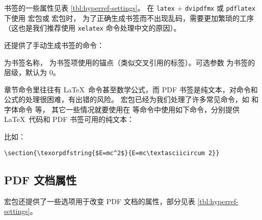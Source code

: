 书签的一些属性见表 \ref{tbl:hyperref-settings}。
在 \texttt{latex} + \texttt{dvipdfmx} 或 \texttt{pdflatex} 下使用  宏包或  宏包时，
为了正确生成书签而不出现乱码，需要更加繁琐的工序（这也是我们推荐使用 \texttt{xelatex} 命令处理中文的原因）。

 还提供了手动生成书签的命令：
\begin{command}
\end{command}
 为书签名称， 为书签项使用的锚点（类似交叉引用的标签）。可选参数  为书签的层级，默认为 0。

章节命令里往往有 \LaTeX\ 命令甚至数学公式，而 PDF 书签是纯文本，对命令和公式的处理很困难，有出错的风险。
 宏包已经为我们处理了许多常见命令，如  和字体命令  等，
其它一些情况就要使用在  等命令中使用如下命令，分别提供 \LaTeX\ 代码和 PDF 书签可用的纯文本：
\begin{command}
\end{command}
比如：
\begin{verbatim}
\section{\texorpdfstring{$E=mc^2$}{E=mc\textasciicircum 2}}
\end{verbatim}

\subsection{PDF 文档属性}

 宏包还提供了一些选项用于改变 PDF 文档的属性，部分见表 \ref{tbl:hyperref-settings}。

